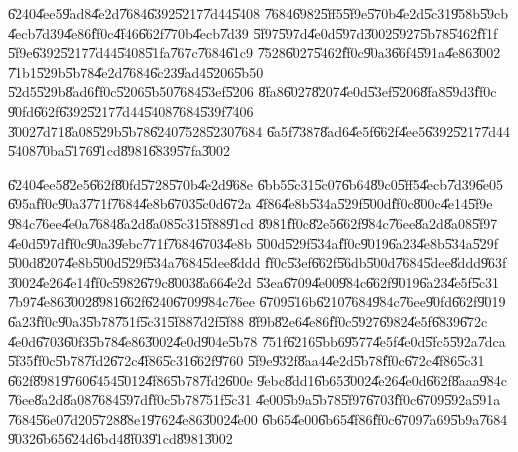 \documentclass{article}
\begin{document}
\bigskip

\U{6240}\U{4ee5}\U{9ad8}\U{4e2d}\U{7684}\U{6392}\U{5217}\U{7d44}\U{5408}%
\U{7684}\U{6982}\U{5ff5}\U{5f9e}\U{570b}\U{4e2d}\U{5c31}\U{958b}\U{59cb}%
\U{4ecb}\U{7d39}\U{4e86}\U{ff0c}\U{4f46}\U{662f}\U{770b}\U{4ecb}\U{7d39}%
\U{5f97}\U{597d}\U{4e0d}\U{597d}\U{3002}\U{5927}\U{5b78}\U{5462}\U{ff1f}%
\U{5f9e}\U{6392}\U{5217}\U{7d44}\U{5408}\U{51fa}\U{767c}\U{7684}\U{61c9}%
\U{7528}\U{6027}\U{5462}\U{ff0c}\U{90a3}\U{66f4}\U{591a}\U{4e86}\U{3002}%
\U{71b1}\U{529b}\U{5b78}\U{4e2d}\U{7684}\U{6c23}\U{9ad4}\U{5206}\U{5b50}%
\U{52d5}\U{529b}\U{8ad6}\U{ff0c}\U{5206}\U{5b50}\U{7684}\U{53ef}\U{5206}%
\U{8fa8}\U{6027}\U{8207}\U{4e0d}\U{53ef}\U{5206}\U{8fa8}\U{59d3}\U{ff0c}%
\U{90fd}\U{662f}\U{6392}\U{5217}\U{7d44}\U{5408}\U{7684}\U{539f}\U{7406}%
\U{3002}\U{7d71}\U{8a08}\U{529b}\U{5b78}\U{6240}\U{7528}\U{5230}\U{7684}%
\U{6a5f}\U{7387}\U{8ad6}\U{4e5f}\U{662f}\U{4ee5}\U{6392}\U{5217}\U{7d44}%
\U{5408}\U{70ba}\U{5176}\U{91cd}\U{8981}\U{6839}\U{57fa}\U{3002}

\bigskip

\U{6240}\U{4ee5}\U{82e5}\U{662f}\U{80fd}\U{5728}\U{570b}\U{4e2d}\U{968e}%
\U{6bb5}\U{5c31}\U{5c07}\U{6b64}\U{89c0}\U{5ff5}\U{4ecb}\U{7d39}\U{6e05}%
\U{695a}\U{ff0c}\U{90a3}\U{771f}\U{7684}\U{4e8b}\U{6703}\U{5c0d}\U{672a}%
\U{4f86}\U{4e8b}\U{534a}\U{529f}\U{500d}\U{ff0c}\U{800c}\U{4e14}\U{5f9e}%
\U{984c}\U{76ee}\U{4e0a}\U{7684}\U{8a2d}\U{8a08}\U{5c31}\U{5f88}\U{91cd}%
\U{8981}\U{ff0c}\U{82e5}\U{662f}\U{984c}\U{76ee}\U{8a2d}\U{8a08}\U{5f97}%
\U{4e0d}\U{597d}\U{ff0c}\U{90a3}\U{9ebc}\U{771f}\U{7684}\U{6703}\U{4e8b}%
\U{500d}\U{529f}\U{534a}\U{ff0c}\U{9019}\U{6a23}\U{4e8b}\U{534a}\U{529f}%
\U{500d}\U{8207}\U{4e8b}\U{500d}\U{529f}\U{534a}\U{7684}\U{5dee}\U{8ddd}%
\U{ff0c}\U{53ef}\U{662f}\U{56db}\U{500d}\U{7684}\U{5dee}\U{8ddd}\U{963f}%
\U{3002}\U{4e26}\U{4e14}\U{ff0c}\U{5982}\U{679c}\U{8003}\U{8a66}\U{4e2d}%
\U{53ea}\U{6709}\U{4e00}\U{984c}\U{662f}\U{9019}\U{6a23}\U{4e5f}\U{5c31}%
\U{7b97}\U{4e86}\U{3002}\U{8981}\U{662f}\U{6240}\U{6709}\U{984c}\U{76ee}%
\U{6709}\U{516b}\U{6210}\U{7684}\U{984c}\U{76ee}\U{90fd}\U{662f}\U{9019}%
\U{6a23}\U{ff0c}\U{90a3}\U{5b78}\U{751f}\U{5c31}\U{5f88}\U{7d2f}\U{5f88}%
\U{8f9b}\U{82e6}\U{4e86}\U{ff0c}\U{5927}\U{6982}\U{4e5f}\U{6839}\U{672c}%
\U{4e0d}\U{6703}\U{60f3}\U{5b78}\U{4e86}\U{3002}\U{4e0d}\U{904e}\U{5b78}%
\U{751f}\U{6216}\U{5bb6}\U{9577}\U{4e5f}\U{4e0d}\U{5fc5}\U{592a}\U{7dca}%
\U{5f35}\U{ff0c}\U{5b78}\U{7fd2}\U{672c}\U{4f86}\U{5c31}\U{662f}\U{9760}%
\U{5f9e}\U{932f}\U{8aa4}\U{4e2d}\U{5b78}\U{ff0c}\U{672c}\U{4f86}\U{5c31}%
\U{662f}\U{8981}\U{9760}\U{6454}\U{5012}\U{4f86}\U{5b78}\U{7fd2}\U{600e}%
\U{9ebc}\U{8dd1}\U{6b65}\U{3002}\U{4e26}\U{4e0d}\U{662f}\U{8aaa}\U{984c}%
\U{76ee}\U{8a2d}\U{8a08}\U{7684}\U{597d}\U{ff0c}\U{5b78}\U{751f}\U{5c31}%
\U{4e00}\U{5b9a}\U{5b78}\U{5f97}\U{6703}\U{ff0c}\U{6709}\U{592a}\U{591a}%
\U{7684}\U{56e0}\U{7d20}\U{5728}\U{88e1}\U{9762}\U{4e86}\U{3002}\U{4e00}%
\U{6b65}\U{4e00}\U{6b65}\U{4f86}\U{ff0c}\U{6709}\U{7a69}\U{5b9a}\U{7684}%
\U{9032}\U{6b65}\U{624d}\U{6bd4}\U{8f03}\U{91cd}\U{8981}\U{3002}
\end{document}
